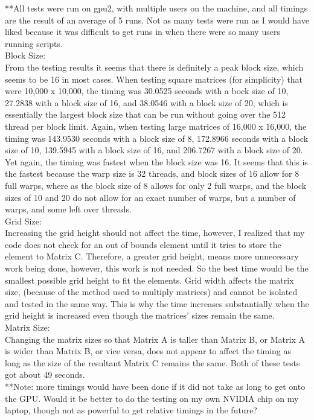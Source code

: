 \documentclass[8pt]{article}
\begin{document}
\bigskip

**All tests were run on gpu2, with multiple users on the machine, and all timings are the result of an average of 5 runs.  Not as many tests were run as I would have liked because it was difficult to get runs in when there were so many users running scripts.\\

Block Size:\\
From the testing results it seems that there is definitely a peak block size, which seems to be 16 in most cases.  When testing square matrices (for simplicity) that were 10,000 x 10,000, the timing was 30.0525 seconds with a bock size of 10, 27.2838 with a block size of 16, and 38.0546 with a block size of 20, which is essentially the largest block size that can be run without going over the 512 thread per block limit.  Again, when testing large matrices of 16,000 x 16,000, the timing was 143.9530 seconds with a block size of 8, 172.8966 seconds with a block size of 10, 139.5945 with a  block size of 16, and 206.7267 with a  block size of 20.  Yet again, the timing was fastest when the block size was 16.  It seems that this is the fastest because the warp size is 32 threads, and block sizes of 16 allow for 8 full warps, where as the block size of 8 allows for only 2 full warps, and the block sizes of 10 and 20 do not allow for an exact number of warps, but a number of warps, and some left over threads.\\

Grid Size:\\
Increasing the grid height should not affect the time, however, I realized that my code does not check for an out of bounds element until it tries to store the element to Matrix C.  Therefore, a greater grid height, means more unnecessary work being done, however, this work is not needed.  So the best time would be the smallest possible grid height to fit the elements.  Grid width affects the matrix size, (because of the method used to multiply matrices) and cannot be isolated and tested in the same way.  This is why the time increases substantially when the grid height is increased even though the matrices' sizes remain the same.\\

Matrix Size:\\
Changing the matrix sizes so that Matrix A is taller than Matrix B, or Matrix A is wider than Matrix B, or vice versa, does not appear to affect the timing as long as the size of the resultant Matrix C remains the same.  Both of these tests got about 49 seconds.\\

**Note: more timings would have been done if it did not take as long to get onto the GPU.  Would it be better to do the testing on my own NVIDIA chip on my laptop, though not as powerful to get relative timings in the future?
\end{document}
